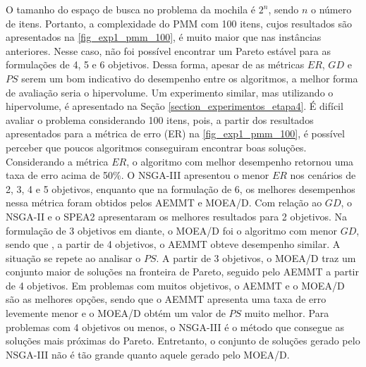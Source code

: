 O tamanho do espaço de busca no problema da mochila é $2^n$, sendo $n$ o número de itens. Portanto, a complexidade do PMM com 100 itens, cujos resultados são apresentados na \autoref{fig_exp1_pmm_100}, é muito maior que nas instâncias anteriores. Nesse caso, não foi possível encontrar um Pareto estável para as formulações de 4, 5 e 6 objetivos. Dessa forma, apesar de as métricas $ER$, $GD$ e $PS$ serem um bom indicativo do desempenho entre os algoritmos, a melhor forma de avaliação seria o hipervolume. Um experimento similar, mas utilizando o hipervolume, é apresentado na Seção \ref{section_experimentos_etapa4}. É difícil avaliar o problema considerando 100 itens, pois, a partir dos resultados apresentados para a métrica de erro (ER) na \autoref{fig_exp1_pmm_100}, é possível perceber que poucos algoritmos conseguiram encontrar boas soluções. Considerando a métrica $ER$, o algoritmo com melhor desempenho retornou uma taxa de erro acima de 50\%. O NSGA-III apresentou o menor $ER$ nos cenários de 2, 3, 4 e 5 objetivos, enquanto que na formulação de 6, os melhores desempenhos nessa métrica foram obtidos pelos AEMMT e MOEA/D. Com relação ao $GD$, o NSGA-II e o SPEA2 apresentaram os melhores resultados para 2 objetivos. Na formulação de 3 objetivos em diante, o MOEA/D foi o algoritmo com menor $GD$, sendo que , a partir de 4 objetivos, o AEMMT obteve desempenho similar. A situação se repete ao analisar o $PS$. A partir de 3 objetivos, o MOEA/D traz um conjunto maior de soluções na fronteira de Pareto, seguido pelo AEMMT a partir de 4 objetivos. Em problemas com muitos objetivos, o AEMMT e o MOEA/D são as melhores opções, sendo que o AEMMT apresenta uma taxa de erro levemente menor e o MOEA/D obtém um valor de $PS$ muito melhor. Para problemas com 4 objetivos ou menos, o NSGA-III é o método que consegue as soluções mais próximas do Pareto. Entretanto, o conjunto de soluções gerado pelo NSGA-III não é tão grande quanto aquele gerado pelo MOEA/D.

